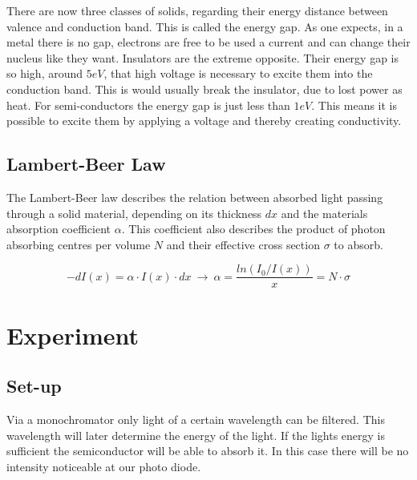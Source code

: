 \documentclass[]{article}
\begin{document}
There are now three classes of solids, regarding their energy distance between valence and conduction band. This is called the energy gap. As one expects, in a metal there is no gap, electrons are free to be used a current and can change their nucleus like they want. Insulators are the extreme opposite. Their energy gap is so high, around $5eV$, that high voltage is necessary to excite them into the conduction band. This is would usually break the insulator, due to lost power as heat. 
For semi-conductors the energy gap is just less than $1eV$. This means it is possible to excite them by applying a voltage and thereby creating conductivity.



\subsection{Lambert-Beer Law}
The Lambert-Beer law describes the relation between absorbed light passing through a solid material, depending on its thickness $dx$ and the materials absorption coefficient $\alpha$. This coefficient also describes the   product of photon absorbing centres per volume $N$ and their effective cross section $\sigma$ to absorb. 

\begin{equation}
-dI(x) = \alpha \cdot I(x)\cdot dx\ \rightarrow\ \alpha=\frac{ln(I_0 / I(x))}{x} = N\cdot \sigma
\end{equation}

\section{Experiment}
\subsection{Set-up}

Via a monochromator only light of a certain wavelength can be filtered. This wavelength will later determine the energy of the light. If the lights energy is sufficient the semiconductor will be able to absorb it. In this case there will be no intensity noticeable at our photo diode. 
\end{document}
